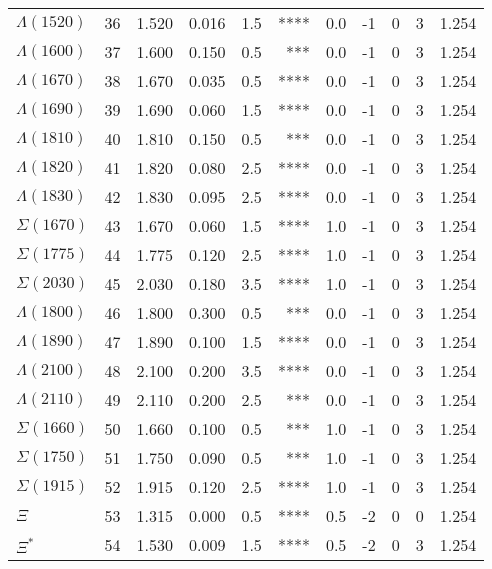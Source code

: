 \documentclass[a4paper,10pt]{article}
\begin{document}
\begin{tabular}{lrcccrccccc}
$\Lambda(1520) $ &  36&  1.520&  0.016 &  1.5 &  ****&      0.0&      -1&       0&       3& 1.254\\
$\Lambda(1600) $ &  37&  1.600&  0.150 &  0.5 &   ***&      0.0&      -1&       0&       3& 1.254\\
$\Lambda(1670) $ &  38&  1.670&  0.035 &  0.5 &  ****&      0.0&      -1&       0&       3& 1.254\\
$\Lambda(1690) $ &  39&  1.690&  0.060 &  1.5 &  ****&      0.0&      -1&       0&       3& 1.254\\
$\Lambda(1810) $ &  40&  1.810&  0.150 &  0.5 &   ***&      0.0&      -1&       0&       3& 1.254\\
$\Lambda(1820) $ &  41&  1.820&  0.080 &  2.5 &  ****&      0.0&      -1&       0&       3& 1.254\\
$\Lambda(1830) $ &  42&  1.830&  0.095 &  2.5 &  ****&      0.0&      -1&       0&       3& 1.254\\
$\Sigma(1670)  $ &  43&  1.670&  0.060 &  1.5 &  ****&      1.0&      -1&       0&       3& 1.254\\
$\Sigma(1775)  $ &  44&  1.775&  0.120 &  2.5 &  ****&      1.0&      -1&       0&       3& 1.254\\
$\Sigma(2030)  $ &  45&  2.030&  0.180 &  3.5 &  ****&      1.0&      -1&       0&       3& 1.254\\
$\Lambda(1800) $ &  46&  1.800&  0.300 &  0.5 &   ***&      0.0&      -1&       0&       3& 1.254\\
$\Lambda(1890) $ &  47&  1.890&  0.100 &  1.5 &  ****&      0.0&      -1&       0&       3& 1.254\\
$\Lambda(2100) $ &  48&  2.100&  0.200 &  3.5 &  ****&      0.0&      -1&       0&       3& 1.254\\
$\Lambda(2110) $ &  49&  2.110&  0.200 &  2.5 &   ***&      0.0&      -1&       0&       3& 1.254\\
$\Sigma(1660)  $ &  50&  1.660&  0.100 &  0.5 &   ***&      1.0&      -1&       0&       3& 1.254\\
$\Sigma(1750)  $ &  51&  1.750&  0.090 &  0.5 &   ***&      1.0&      -1&       0&       3& 1.254\\
$\Sigma(1915)  $ &  52&  1.915&  0.120 &  2.5 &  ****&      1.0&      -1&       0&       3& 1.254\\
$\Xi           $ &  53&  1.315&  0.000 &  0.5 &  ****&      0.5&      -2&       0&       0& 1.254\\
$\Xi^*         $ &  54&  1.530&  0.009 &  1.5 &  ****&      0.5&      -2&       0&       3& 1.254\\

\end{tabular}
\end{document}
